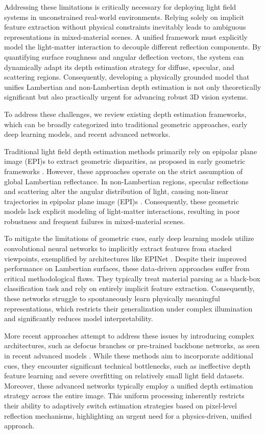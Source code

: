 \documentclass[lettersize,journal]{IEEEtran}
\begin{document}
Addressing these limitations is critically necessary for deploying light field systems in unconstrained real-world environments. Relying solely on implicit feature extraction without physical constraints inevitably leads to ambiguous representations in mixed-material scenes. A unified framework must explicitly model the light-matter interaction to decouple different reflection components. By quantifying surface roughness and angular deflection vectors, the system can dynamically adapt its depth estimation strategy for diffuse, specular, and scattering regions. Consequently, developing a physically grounded model that unifies Lambertian and non-Lambertian depth estimation is not only theoretically significant but also practically urgent for advancing robust 3D vision systems.

To address these challenges, we review existing depth estimation frameworks, which can be broadly categorized into traditional geometric approaches, early deep learning models, and recent advanced networks.

Traditional light field depth estimation methods primarily rely on epipolar plane image (EPI)s to extract geometric disparities, as proposed in early geometric frameworks . However, these approaches operate on the strict assumption of global Lambertian reflectance. In non-Lambertian regions, specular reflections and scattering alter the angular distribution of light, causing non-linear trajectories in epipolar plane image (EPI)s . Consequently, these geometric models lack explicit modeling of light-matter interactions, resulting in poor robustness and frequent failures in mixed-material scenes.

To mitigate the limitations of geometric cues, early deep learning models utilize convolutional neural networks to implicitly extract features from stacked viewpoints, exemplified by architectures like EPINet . Despite their improved performance on Lambertian surfaces, these data-driven approaches suffer from critical methodological flaws. They typically treat material parsing as a black-box classification task and rely on entirely implicit feature extraction. Consequently, these networks struggle to spontaneously learn physically meaningful representations, which restricts their generalization under complex illumination and significantly reduces model interpretability.

More recent approaches attempt to address these issues by introducing complex architectures, such as defocus branches or pre-trained backbone networks, as seen in recent advanced models . While these methods aim to incorporate additional cues, they encounter significant technical bottlenecks, such as ineffective depth feature learning and severe overfitting on relatively small light field datasets. Moreover, these advanced networks typically employ a unified depth estimation strategy across the entire image. This uniform processing inherently restricts their ability to adaptively switch estimation strategies based on pixel-level reflection mechanisms, highlighting an urgent need for a physics-driven, unified approach.
\end{document}
